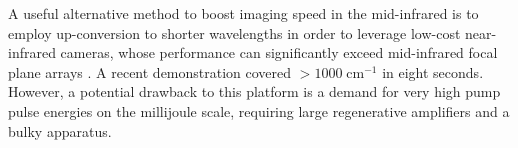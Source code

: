 \documentclass{optica-article}
\begin{document}

A useful alternative method to boost imaging speed in the mid-infrared is to employ up-conversion to shorter wavelengths in order to leverage low-cost near-infrared cameras, whose performance can significantly exceed mid-infrared focal plane arrays \cite{junaidVideorateMidinfraredHyperspectral2019,knezInfraredChemicalImaging2020,potmaRapidChemicallySelective2021}. A recent demonstration covered \mbox{$>$$1000 \; \mathrm{cm^{-1}}$} \cite{zhaoHighspeedScanlessEntire2023} in eight seconds. 
% 
% 
% 
However, a potential drawback to this platform is a demand for very high pump pulse energies on the millijoule scale, requiring large regenerative amplifiers and a bulky apparatus.




\end{document}
